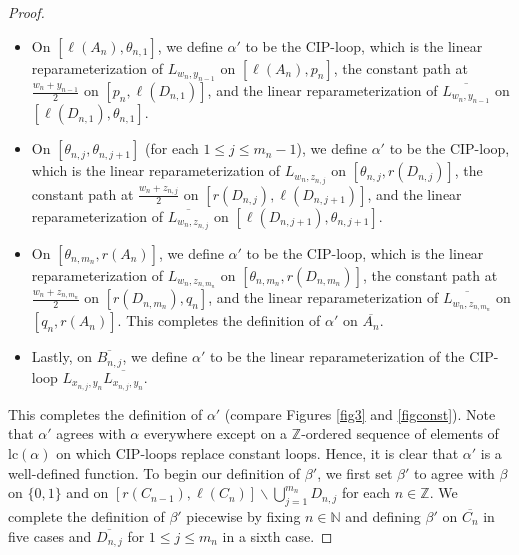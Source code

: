 \documentclass[12pt, leqno]{amsart}
\newcommand{\bbn}{\mathbb{N}}
\newcommand{\bbz}{\mathbb{Z}}
\newcommand{\ov}{\overline}
\newcommand{\lc}{\text{lc}}
\theoremstyle{definition}\newtheorem{definition}[theorem]{Definition}
\begin{document}
\begin{proof}
\begin{itemize}
    \item[$\bf (A1)$]\label{alpha'1} On $[\ell(A_{n}),\theta_{n,1}]$, we define $\alpha'$ to be the CIP-loop, which is the linear reparameterization of $L_{w_n,y_{n-1}}$ on $[\ell(A_{n}),p_n]$, the constant path at $\frac{w_n+y_{n-1}}{2}$ on $[p_n,\ell(D_{n,1})]$, and the linear reparameterization of $\ov{L_{w_n,y_{n-1}}}$ on $[\ell(D_{n,1}),\theta_{n,1}]$.
\vspace{.75em}
    \item[$\bf (A2)$]\label{alpha'2} On $[\theta_{n,j},\theta_{n,j+1}]$ (for each $1\leq j\leq m_{n}-1$), we define $\alpha '$ to be the CIP-loop, which is the linear reparameterization of $L_{w_n,z_{n,j}}$ on $[\theta_{n,j},r(D_{n,j})]$, the constant path at $\frac{w_n+z_{n,j}}{2}$ on $[r(D_{n,j}),\ell(D_{n,j+1})]$, and the linear reparameterization of $\ov{L_{w_n,z_{n,j}}}$ on $[\ell(D_{n,j+1}),\theta_{n,j+1}]$.
\vspace{.75em}
    \item[$\bf (A3)$]\label{alpha'3} On $[\theta_{n,m_n},r(A_n)]$, we define $\alpha '$ to be the CIP-loop, which is the linear reparameterization of $L_{w_n, z_{n,m_n}}$ on $[\theta_{n,m_n},r(D_{n,m_n})]$, the constant path at $\frac{w_n+ z_{n,m_n}}{2}$ on $[r(D_{n,m_n}),q_n]$, and the linear reparameterization of $\ov{L_{w_n, z_{n,m_n}}}$ on $[q_n,r(A_n)]$. This completes the definition of $\alpha '$ on $\ov{A_n}$.
\vspace{.75em}
    \item[$\bf (A4)$]\label{alpha'4} Lastly, on $\ov{B_{n,j}}$, we define $\alpha '$ to be the linear reparameterization of the CIP-loop $L_{x_{n,j},y_{n}}\ov{L_{x_{n,j},y_{n}}}$.
\end{itemize}

This completes the definition of $\alpha '$ (compare Figures \ref{fig3} and \ref{figconst}). Note that $\alpha'$ agrees with $\alpha$ everywhere except on a $\bbz$-ordered sequence of elements of $\lc(\alpha)$ on which CIP-loops replace constant loops. Hence, it is clear that $\alpha'$ is a well-defined function.
To begin our definition of $\beta'$, we first set $\beta'$ to agree with $\beta$ on $\{0,1\}$ and on $[r(C_{n-1}),\ell(C_n)]\backslash \bigcup_{j=1}^{m_n}D_{n,j}$ for each $n\in\bbz$. We complete the definition of $\beta' $ piecewise by fixing $n\in\bbn$ and defining $\beta'$ on $\ov{C_n}$ in five cases and $\ov{D_{n,j}}$ for $1\leq j\leq m_n$ in a sixth case.


\end{proof}
\end{document}
